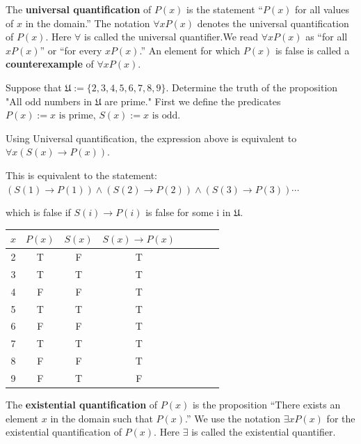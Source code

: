\begin{defn}
The \textbf{universal quantification} of $P(x)$ is the statement
“$P(x)$ for all values of $x$ in the domain.”
The notation $\forall x P(x)$ denotes the universal quantification of $P(x)$. Here $\forall$ is called the
universal quantifier.We read $\forall xP(x)$ as “for all $x P(x)$” or “for every  $xP(x)$.” An element
for which $P(x)$ is false is called a \textbf{counterexample} of $ \forall xP(x)$.
\end{defn}
\begin{exmp}

Suppose that $\mathfrak{U}:= \{2,3,4,5,6,7,8,9\}$.
Determine the truth of the proposition "All odd numbers in $\mathfrak{U}$ are prime." 
First we define the predicates
$P(x):=\text{$x$ is prime}$, 
$S(x):= \text{$x$ is odd}$.

Using Universal quantification, the expression above is equivalent to $\forall x (S(x)\to P(x))$.

This is equivalent to the statement:
$(S(1) \to P(1)) \land (S(2) \to P(2)) \land (S(3) \to P(3)) \cdots$

which is false if $S(i)\to P(i)$ is false for some i in $\mathfrak{U}$.

\begin{center} 
\begin{tabular}{ | c | c | c |c |c |c |c |c |} 
  \hline
 $x$& $P(x)$ & $S(x)$ & $S(x) \to P(x)$ \\
 \hline
  2 & T & F& T\\ 
  3 & T & T & T\\ 
  4 & F & F & T\\ 
  5 & T & T & T\\ 
  6 & F & F & T\\ 
  7 & T & T & T\\ 
  8 & F & F & T\\ 
  9 & F & T & F\\ 
  \hline
\end{tabular}

\end{center}

\vspace{2cm}
\end{exmp}
\begin{defn}
The \textbf{existential quantification} of $P(x)$ is the proposition
“There exists an element $x$ in the domain such that $P(x)$.”
We use the notation $\exists xP(x)$ for the existential quantification of $P(x)$. Here $\exists$ is called the
existential quantifier.
\end{defn}
